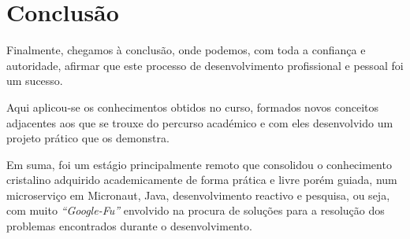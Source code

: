\chapter{Conclusão}\label{cap6}

Finalmente, chegamos à conclusão, onde podemos, com toda a confiança e autoridade, afirmar que este processo de desenvolvimento profissional e pessoal foi um sucesso.

Aqui aplicou-se os conhecimentos obtidos no curso, formados novos conceitos adjacentes aos que se trouxe do percurso académico e com eles desenvolvido um projeto prático que os demonstra.

Em suma, foi um estágio principalmente remoto que consolidou o conhecimento cristalino adquirido academicamente de forma prática e livre porém guiada, num microserviço em Micronaut, Java, desenvolvimento reactivo e pesquisa, ou seja, com muito \textit{``Google-Fu''} envolvido na procura de soluções para a resolução dos problemas encontrados durante o desenvolvimento.
